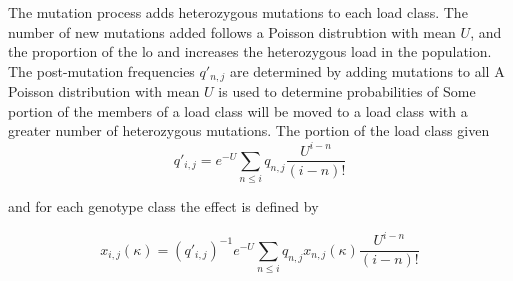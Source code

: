 
   The mutation process adds heterozygous mutations to each load class.  The number of new mutations added follows a Poisson distrubtion with mean $U$, and the proportion of the lo and increases the heterozygous load in the population.  The post-mutation frequencies $q'_{n,j}$ are determined by adding mutations to all A Poisson distribution with mean $U$ is used to determine probabilities of Some portion of the members of a load class will be moved to a load class with a greater number of heterozygous mutations.  The portion of the load class given 
\[
q'_{i,j}  = e^{ - U} \sum\limits_{n \le i} {q_{n,j} \frac{{U^{i - n} }}{{(i - n)!}}} 
\]

and for each genotype class the effect is defined by

\[
x_{i,j} (\kappa ) = (q'_{i,j} )^{ - 1} e^{ - U} \sum\limits_{n \le i} {q_{n,j} x_{n,j} (\kappa )} \frac{{U^{i - n} }}{{(i - n)!}}
\]



